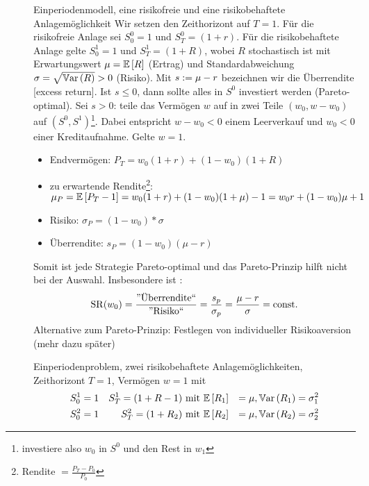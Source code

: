 \begin{description}
	\item[] Einperiodenmodell, eine risikofreie und eine risikobehaftete Anlagemöglichkeit \linebreak
	Wir setzen den Zeithorizont auf $T = 1$. Für die risikofreie Anlage sei $S_0^0 = 1$ und $S_T^0 = (1+r)$. Für die risikobehaftete Anlage gelte $S_0^1 = 1$ und $S_T^1 = (1+R)$, wobei $R$ stochastisch ist mit Erwartungswert $\mu = \EW[R]$ (Ertrag) und Standardabweichung $\sigma = \sqrt{\Var[R]} > 0$ (Risiko).
	Mit $s \defeq \mu  - r$ bezeichnen wir die Überrendite [excess return]. Ist $s \le 0$, dann sollte alles in $S^0$ investiert werden (Pareto-optimal). Sei $s > 0$: teile das Vermögen $w$ auf in zwei Teile $(w_0, w - w_0)$ auf $(S^0, S^1)$\footnote{investiere also $w_0$ in $S^0$ und den Rest in $w_1$}. Dabei entspricht $w - w_0 < 0$ einem Leerverkauf und $w_0 < 0$ einer Kreditaufnahme. Gelte $w=1$. 
	\begin{itemize}[nolistsep]
		\item Endvermögen: $P_T = w_0 (1+r) + (1-w_0) (1+R)$
		\item zu erwartende Rendite\footnote{Rendite $= \frac{P_T - P_0}{P_0}$}: $\mu_P = \EW[P_T - 1] = w_0 (1+r) + (1-w_0)(1+\mu) -1 = w_0 r + (1-w_0) \mu + 1$
		\item Risiko:  $\sigma_P = (1-w_0) * \sigma$
		\item Überrendite: $s_P = (1-w_0) (\mu - r)$
	\end{itemize}
	Somit ist jede Strategie Pareto-optimal und das Pareto-Prinzip hilft nicht bei der Auswahl. Insbesondere ist :
	\begin{equation*}
		\SR(w_0) = \frac{\text{''Überrendite``}}{\text{''Risiko``}} = \frac{s_p}{\sigma_p} = \frac{\mu - r}{\sigma} = \text{const.}
	\end{equation*}
	Alternative zum Pareto-Prinzip: Festlegen von individueller Risikoaversion (mehr dazu später)
	\item[] Einperiodenproblem, zwei risikobehaftete Anlagemöglichkeiten, Zeithorizont $T=1$, Vermögen $w=1$ mit
	\begin{equation*}
		\begin{aligned}
		S_0^1 &= 1 & S_T^1 = (1+R-1) &\mit \EW[R_1] &= \mu, \Var[R_1] = \sigma_1^2 \\
		S_0^2 &= 1 & S_T^2 = (1+R_2) &\mit \EW[R_2] &= \mu, \Var[R_2] = \sigma_2^2
		\end{aligned}
	\end{equation*}

\end{description}
